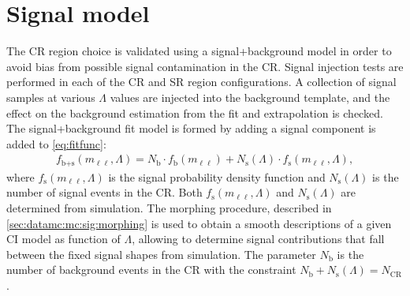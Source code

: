 \section{Signal model}\label{sec:sigmodel}
The CR region choice is validated using a signal+background model in order to avoid bias from possible signal contamination in the CR. Signal injection tests are performed in each of the CR and SR region configurations. A collection of signal samples at various $\Lambda$ values are injected into the background template, and the effect on the background estimation from the fit and extrapolation is checked. The signal+background fit model is formed by adding a signal component is added to \cref{eq:fitfunc}: 
\begin{equation}
    \label{eq:sbfunction}
    \begin{aligned}
    f_\textrm{b+s}(m_{\ell\ell},\Lambda) = N_\textrm{b}\cdot f_\textrm{b}(m_{\ell\ell}) + N_\textrm{s}(\Lambda)\cdot f_\textrm{s}(m_{\ell\ell},\Lambda),
    \end{aligned} 
\end{equation}
where $f_\textrm{s}(m_{\ell\ell},\Lambda)$ is the signal probability density function and $N_\textrm{s}(\Lambda)$ is the number of signal events in the CR. Both $f_\textrm{s}(m_{\ell\ell},\Lambda)$ and $N_\textrm{s}(\Lambda)$ are determined from simulation. The morphing procedure, described in \cref{sec:datamc:mc:sig:morphing} is used to obtain a smooth descriptions of a given CI model as function of $\Lambda$, allowing to determine signal contributions that fall between the fixed signal shapes from simulation. The parameter $N_\textrm{b}$ is the number of background events in the CR with the constraint $N_\textrm{b}+N_\textrm{s}(\Lambda)=N_\textrm{CR}$. 

